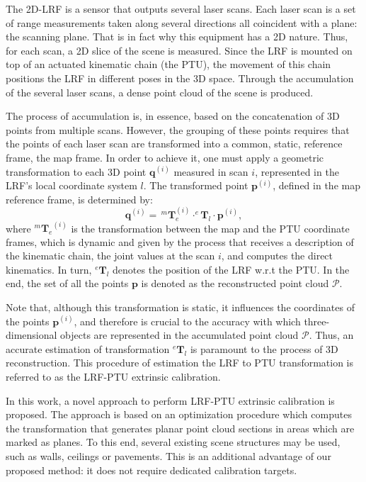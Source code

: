 \documentclass[conference]{IEEEtran}
\begin{document}
The 2D-LRF is a sensor that outputs several laser scans. Each laser scan is a set of range measurements taken along several directions all coincident with a plane: the scanning plane. That is in fact why this equipment has a 2D nature. Thus, for each scan, a 2D slice of the scene is measured. Since the LRF is mounted on top of an actuated kinematic chain (the PTU), the movement of this chain positions the LRF in different poses in the 3D space. Through the accumulation of the several laser scans, a dense point cloud of the scene is produced. 

The process of accumulation is, in essence, based on the concatenation of 3D points from multiple scans. However, the grouping of these points requires that the points of each laser scan are transformed into a common, static, reference frame, the map frame. In order to achieve it, one must apply a geometric transformation to each 3D point $\mathbf{q}^{(i)}$ measured in scan $i$, represented in the LRF's local coordinate system $l$. The transformed point $\mathbf{p}^{(i)}$, defined in the map reference frame, is determined by:
%
\begin{equation}\label{equation:point-reconstruction}
    \mathbf{q}^{(i)} = \, ^{m}\mathbf{T}_{e}^{(i)} \cdot ^{e}\mathbf{T}_{l} \cdot \mathbf{p}^{(i)},
\end{equation}
%
\noindent where ${^{m}\mathbf{T}_{e}}^{(i)}$ is the transformation between the map and the PTU coordinate frames, which is dynamic and given by the process that receives a description of the kinematic chain, the joint values at the scan $i$, and computes the direct kinematics. In turn, $^{e}\mathbf{T}_{l}$ denotes the position of the LRF w.r.t the PTU. In the end, the set of all the points $\mathbf{p}$ is denoted as the reconstructed point cloud $\mathcal{P}$.

Note that, although this transformation is static, it influences the coordinates of the points $\mathbf{p}^{(i)}$, and therefore is crucial to the accuracy with which three-dimensional objects are represented in the accumulated point cloud $\mathcal{P}$.
Thus, an accurate estimation of transformation $^{e}\mathbf{T}_{l}$ is paramount to the process of 3D reconstruction. This procedure of estimation the LRF to PTU transformation is referred to as the LRF-PTU extrinsic calibration.

In this work, a novel approach to perform LRF-PTU extrinsic calibration is proposed. The approach is based on an optimization procedure which computes the transformation that generates planar point cloud sections in areas which are marked as planes. To this end, several existing scene structures may be used, such as walls, ceilings or pavements. This is an additional advantage of our proposed method: it does not require dedicated calibration targets.
\end{document}
